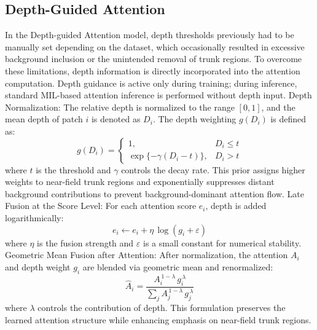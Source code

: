\documentclass{article}
\begin{document}
\subsection{Depth-Guided Attention}
In the Depth-guided Attention model, depth thresholds previously had to be manually set depending on the dataset, which occasionally resulted in excessive background inclusion or the unintended removal of trunk regions. To overcome these limitations, depth information is directly incorporated into the attention computation. Depth guidance is active only during training; during inference, standard MIL-based attention inference is performed without depth input.
Depth Normalization:
The relative depth is normalized to the range $[0, 1]$, and the mean depth of patch $i$ is denoted as $D_i$. The depth weighting $g(D_i)$ is defined as:
\begin{equation}\tag{11}
g(D_i)=
\begin{cases}
1,& D_i\le t\\
\exp\{-\gamma(D_i-t)\},& D_i>t
\end{cases}
\end{equation}
where $t$ is the threshold and $\gamma$ controls the decay rate. This prior assigns higher weights to near-field trunk regions and exponentially suppresses distant background contributions to prevent background-dominant attention flow.
Late Fusion at the Score Level:
For each attention score $e_i$, depth is added logarithmically:
\begin{equation}\tag{12}
e_i \leftarrow e_i + \eta\, \log(g_i+\varepsilon)
\end{equation}
where $\eta$ is the fusion strength and $\varepsilon$ is a small constant for numerical stability.
Geometric Mean Fusion after Attention:
After normalization, the attention $A_i$ and depth weight $g_i$ are blended via geometric mean and renormalized:
\begin{equation}\tag{13}
\hat{A}_i=\frac{A_i^{\,1-\lambda}\, g_i^{\,\lambda}}{\sum_{j} A_j^{\,1-\lambda}\, g_j^{\,\lambda}}
\end{equation}
where $\lambda$ controls the contribution of depth. This formulation preserves the learned attention structure while enhancing emphasis on near-field trunk regions.
\end{document}
